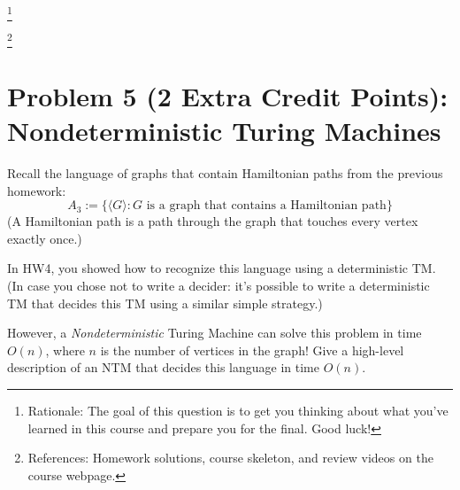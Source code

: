 \documentclass[letterpaper,11pt,twoside]{article}
\theoremstyle{plain}
\theoremstyle{definition}
\theoremstyle{remark}
\theoremstyle{restate}
\newcommand\blfootnote[1]{%
  \begingroup
  \renewcommand\thefootnote{}\footnote{#1}%
  \addtocounter{footnote}{-1}%
  \endgroup
}
\begin{document}
    \blfootnote{ Rationale: The goal of this question is to get you thinking about what you've learned in this course and prepare you for the final. Good luck! }
    \blfootnote{ References: Homework solutions, course skeleton, and review videos on the course webpage. }


\clearpage
\section{Problem 5 (2 Extra Credit Points): Nondeterministic Turing Machines}
Recall the language of graphs that contain Hamiltonian paths from the previous homework:
\[
    A_3 := \{\langle G \rangle: G \text{ is a graph that contains a Hamiltonian path}\}
\]
(A Hamiltonian path is a path through the graph that touches every vertex exactly once.)

In HW4, you showed how to recognize this language using a deterministic TM. (In case you chose not to write a decider: it's possible to write a deterministic TM that decides this TM using a similar simple strategy.)

However, a \textit{Nondeterministic} Turing Machine can solve this problem in time $O(n)$, where $n$ is the number of vertices in the graph! Give a high-level description of an NTM that decides this language in time $O(n)$. 
    
\end{document}
